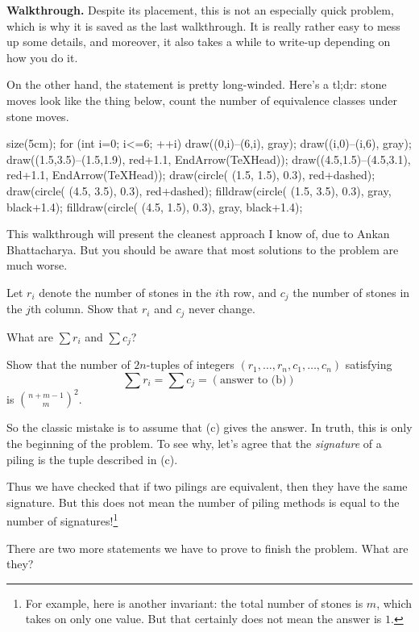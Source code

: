 \documentclass[11pt]{scrartcl}
\providecommand{\ii}{\item}
\newenvironment{walkthrough}{\noindent\textbf{\color{green!40!black}Walkthrough.}}{}
\begin{document}
\begin{walkthrough}
	Despite its placement, this is not an especially quick problem,
	which is why it is saved as the last walkthrough.
	It is really rather easy to mess up some details,
	and moreover, it also takes a while to write-up depending on how you do it.

	On the other hand, the statement is pretty long-winded.
	Here's a tl;dr: stone moves look like the thing below,
	count the number of equivalence classes under stone moves.
	\begin{center}
		\begin{asy}
			size(5cm);
			for (int i=0; i<=6; ++i) {
					draw((0,i)--(6,i), gray);
					draw((i,0)--(i,6), gray);
				}
			draw((1.5,3.5)--(1.5,1.9), red+1.1, EndArrow(TeXHead));
			draw((4.5,1.5)--(4.5,3.1), red+1.1, EndArrow(TeXHead));
			draw(circle( (1.5, 1.5), 0.3), red+dashed);
			draw(circle( (4.5, 3.5), 0.3), red+dashed);
			filldraw(circle( (1.5, 3.5), 0.3), gray, black+1.4);
			filldraw(circle( (4.5, 1.5), 0.3), gray, black+1.4);
		\end{asy}
	\end{center}

	This walkthrough will present the cleanest approach I know of,
	due to Ankan Bhattacharya.
	But you should be aware that most solutions to the problem are much worse.

	\begin{walk}
		\ii Let $r_i$ denote the number of stones in the $i$th row,
		and $c_j$ the number of stones in the $j$th column.
		Show that $r_i$ and $c_j$ never change.

		\ii What are $\sum r_i$ and $\sum c_j$?

		\ii Show that the number of $2n$-tuples of integers
		$(r_1, \dots, r_n, c_1, \dots, c_n)$ satisfying
		\[ \sum r_i = \sum c_j = (\text{answer to (b)}) \]
		is $\binom{n+m-1}{m}^2$.
	\end{walk}
	So the classic mistake is to assume that (c) gives the answer.
	In truth, this is only the beginning of the problem.
	To see why, let's agree that the \emph{signature}
	of a piling is the tuple described in (c).

	Thus we have checked that if two pilings are equivalent,
	then they have the same signature.
	But this does not mean the number of piling methods
	is equal to the number of signatures!\footnote{For example,
		here is another invariant:
		the total number of stones is $m$, which takes on only one value.
		But that certainly does not mean the answer is $1$.}
	\begin{walk}[resume]
		\ii There are two more statements we have to prove
		to finish the problem. What are they?
	\end{walk}


\end{walkthrough}
\end{document}
